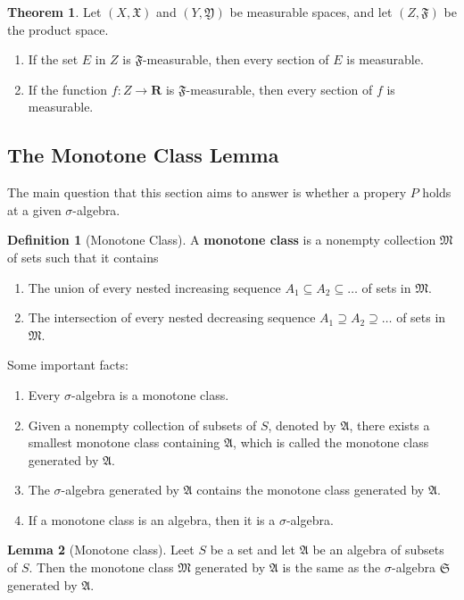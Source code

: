 \documentclass[12pt,a4paper]{article}
\theoremstyle{definition}
\newtheorem{theorem}{Theorem}[section]
\newtheorem{lemma}[theorem]{Lemma}
\newtheorem{definition}{Definition}[section]
\begin{document}
\begin{theorem}
	Let $(X, \mathfrak{X})$ and $(Y, \mathfrak{Y})$ be measurable spaces, and let $(Z, \mathfrak{F})$ be the product space.
	\begin{enumerate}
		\item If the set $E$ in $Z$ is $\mathfrak{F}$-measurable, then every section of $E$ is measurable. 
		\item If the function $f : Z \longrightarrow \textbf{R}$ is $\mathfrak{F}$-measurable, then every section of $f$ is measurable. 
	\end{enumerate}
\end{theorem}

\subsection{The Monotone Class Lemma}

The main question that this section aims to answer is whether a propery $P$ holds at a given $\sigma$-algebra. 

\begin{definition}[Monotone Class]
	A \textbf{monotone class} is a nonempty collection $\mathfrak{M}$ of sets such that it contains
	\begin{enumerate}
		\item The union of every nested increasing sequence $A_1 \subseteq A_2 \subseteq \ldots $ of sets in $\mathfrak{M}$.
		\item The intersection of every nested decreasing sequence $A_1 \supseteq A_2 \supseteq \ldots $ of sets in $\mathfrak{M}$.
	\end{enumerate}
\end{definition}

Some important facts:
\begin{enumerate}
	\item Every $\sigma$-algebra is a monotone class.
	\item Given a nonempty collection of subsets of $S$, denoted by $\mathfrak{A}$, there exists a smallest monotone class containing $\mathfrak{A}$, which is called the monotone class generated by $\mathfrak{A}$.
	\item The $\sigma$-algebra generated by $\mathfrak{A}$ contains the monotone class generated by $\mathfrak{A}$.
	\item If a monotone class is an algebra, then it is a $\sigma$-algebra.
\end{enumerate}

\begin{lemma}[Monotone class]
	Leet $S$ be a set and let $\mathfrak{A}$ be an algebra of subsets of $S$. Then the monotone class $\mathfrak{M}$ generated by $\mathfrak{A}$ is the same as the $\sigma$-algebra $\mathfrak{S}$ generated by $\mathfrak{A}$.
\end{lemma}
\end{document}
